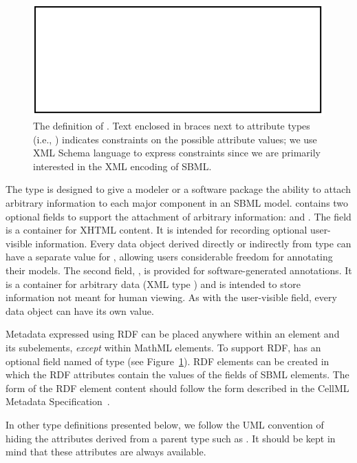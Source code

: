 \documentclass[10pt,twocolumntoc]{cekarticle}
\newcommand{\vref}[1]{\ref{#1}}
\begin{document}
\begin{figure}[h]
  \centering
  \includegraphics[scale = 0.68]{identified}
  \caption{The definition of .  Text enclosed in braces next
    to attribute types (i.e., ) indicates
    constraints on the possible attribute values; we use XML Schema
    language to express constraints since we are primarily interested in
    the XML encoding of SBML.}
  \label{fig:sbase}
\end{figure}

The type  is designed to give a modeler or a software package
the ability to attach arbitrary information to each major component in an
SBML model.   contains two optional fields to support the
attachment of arbitrary information:  and
.  The field  is a container for XHTML
content.  It is intended for recording optional user-visible information.
Every data object derived directly or indirectly from type 
can have a separate value for , allowing users considerable
freedom for annotating their models.  The second field,
, is provided for software-generated annotations.  It is
a container for arbitrary data (XML type ) and is intended to
store information not meant for human viewing.  As with the user-visible
 field, every data object can have its own
 value.

Metadata expressed using RDF can be placed anywhere within an 
element and its subelements, \emph{except} within MathML elements.  To
support RDF,  has an optional field named  of
type  (see Figure~\vref{fig:sbase}).  RDF 
elements can be created in which the RDF  attributes
contain the values of the  fields of SBML elements.  The
form of the RDF element content should follow the form described in the
CellML Metadata Specification~\citep{cuellar:2002}.

In other type definitions presented below, we follow the UML convention of
hiding the attributes derived from a parent type such as . It
should be kept in mind that these attributes are always available.
\end{document}
